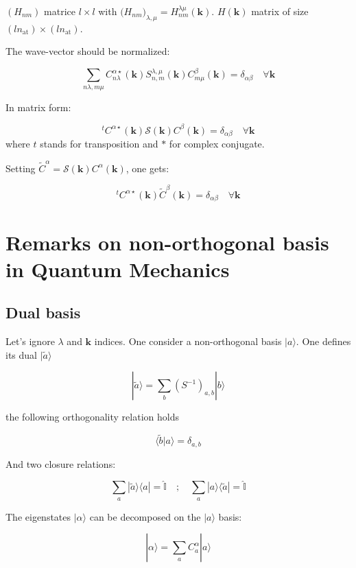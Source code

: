 \documentclass{article}
\newcommand{\bra}[1]{\langle #1|}
\newcommand{\ket}[1]{|#1\rangle}
\newcommand{\braket}[2]{\langle #1|#2\rangle}
\newcommand{\op}[1]{\hat{#1}}
\begin{document}
\noindent
$(H_{n m}) $ matrice $l\times l$ with $\Big( H_{n m} \Big)_{\lambda,\mu}=H_{nm}^{\lambda 
\mu}(\mathbf{k})$. $H(\mathbf{k})$ matrix of size $(ln_{\text{at}})\times (ln_{\text{at}})$.

\noindent
The wave-vector should be normalized:

\[ \displaystyle \sum_{n \lambda,m\mu} C_{n \lambda}^{\alpha  \star}(\mathbf{k})S_{n,m}^{\lambda,\mu}(\mathbf{k})C_{m 
\mu}^{\beta}(\mathbf{k})=\delta_{\alpha \beta}
\quad \forall \mathbf{k} \]

\noindent
In matrix form:

\[ ^tC^{\alpha \star}(\mathbf{k})\mathcal{S}(\mathbf{k})C^{\beta}(\mathbf{k})=
\delta_{\alpha \beta} \quad \forall \mathbf{k} \]
where $t$ stands for transposition and $*$ for complex conjugate.

\noindent
Setting
$\widetilde{C}^{\alpha}=\mathcal{S}(\mathbf{k})C^{\alpha}(\mathbf{k})$, one gets:

\[ ^tC^{\alpha \star}(\mathbf{k})\widetilde{C}^{\beta}(\mathbf{k})=\delta_{\alpha \beta}
\quad \forall \mathbf{k} \]



\section{Remarks on non-orthogonal basis in Quantum Mechanics}

\subsection{Dual basis}
\noindent
Let's ignore $\lambda$ and $\mathbf{k}$ indices. One consider
a non-orthogonal basis $\ket{a}$. One defines its dual $\ket{\tilde{a}}$

    
\[\displaystyle \ket{\tilde{a}}=\sum_{b}  (S^{-1})_{a,b} \ket{b }\]

\noindent
the following  orthogonality relation holds

\[\braket{\tilde{b}}{ a }= \delta_{a,b} \]


\noindent
And two closure relations: 

\[ \displaystyle \sum_{a} \ket{\tilde{a}} \bra{a}=\op{\mathbb{I}} \quad ; \quad
                 \sum_{a } \ket{a} \bra{\tilde{a}} =\op{\mathbb{I}}
 \]

\noindent
The eigenstates $\ket{\alpha}$ can be decomposed on the $\ket{a}$ basis:

\[ \ket{\alpha}=\sum_a C_a^{\alpha} \ket{a} \]
\end{document}
